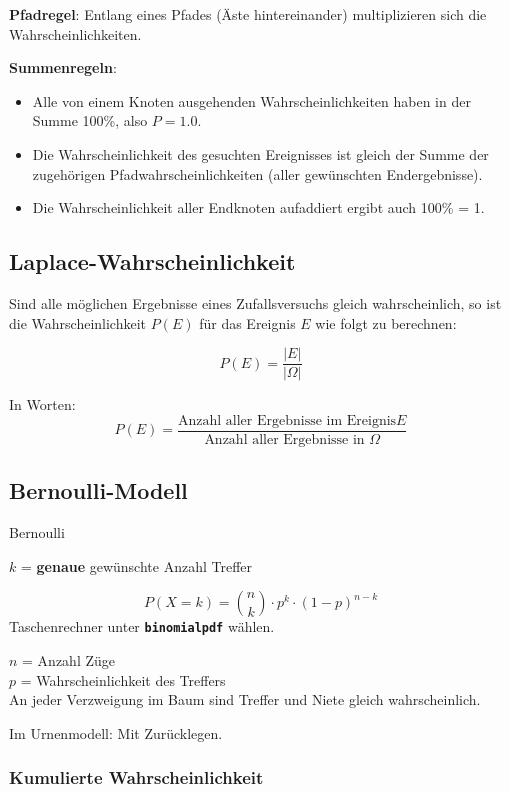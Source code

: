 \begin{multicols}{2}
\textbf{Pfadregel}:
Entlang eines Pfades (Äste hintereinander) multiplizieren sich die
Wahrscheinlichkeiten.

\textbf{Summenregeln}:
\begin{itemize}
\item Alle von einem Knoten ausgehenden Wahrscheinlichkeiten haben in
der Summe 100\%, also $P=1.0$.
\item Die Wahrscheinlichkeit des gesuchten Ereignisses ist gleich der
Summe der zugehörigen Pfadwahrscheinlichkeiten (aller gewünschten
Endergebnisse).
\item Die Wahrscheinlichkeit aller Endknoten aufaddiert ergibt auch
100\% = 1.
\end{itemize}




\subsection{Laplace-Wahrscheinlichkeit}
Sind alle möglichen Ergebnisse eines Zufallsversuchs gleich
wahrscheinlich, so ist die Wahrscheinlichkeit $P(E)$ für das Ereignis
$E$ wie folgt zu berechnen:

\begin{gesetz}{}{}
$$P(E) = \frac{|E|}{|\Omega|}$$
\end{gesetz}

In Worten:
$$P(E) = \frac{\textrm{Anzahl aller Ergebnisse
im Ereignis
}E}{\textrm{Anzahl aller Ergebnisse in }\Omega}$$


\subsection{Bernoulli-Modell}
\begin{gesetz}{Bernoulli}{}

$k$ = \textbf{genaue} gewünschte Anzahl Treffer

$$P(X=k) = {n \choose k}\cdot{}p^k\cdot{}(1-p)^{n-k}$$
Taschenrechner
unter  \textbf{\texttt{binomialpdf}} wählen.

$n$ = Anzahl Züge\\
$p$ = Wahrscheinlichkeit des Treffers\\

An jeder Verzweigung im Baum sind Treffer und Niete gleich
wahrscheinlich.

Im Urnenmodell: Mit Zurücklegen.
\end{gesetz}

\subsubsection{Kumulierte Wahrscheinlichkeit}


\end{multicols}
